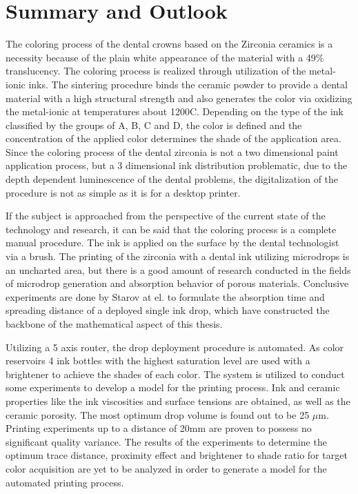 \cleardoublepage
{}


\chapter{Summary and Outlook}
The coloring process of the dental crowns based on the Zirconia ceramics is a necessity because of the plain white appearance of the material with a 49\% translucency. The coloring process is realized through utilization of the metal-ionic inks. The sintering procedure binds the ceramic powder to provide a dental material with a high structural strength and also generates the color via oxidizing the metal-ionic at temperatures about 1200\textdegree C. Depending on the type of the ink classified by the groups of A, B, C and D, the color is defined and the concentration of the applied color determines the shade of the application area. Since the coloring process of the dental zirconia is not a two dimensional paint application process, but a 3 dimensional ink distribution problematic, due to the depth dependent luminescence of the dental problems, the digitalization of the procedure is not as simple as it is for a desktop printer. 

If the subject is approached from the perspective of the current state of the technology and research, it can be said that the coloring process is a complete manual procedure. The ink is applied on the surface by the dental technologist via a brush. The printing of the zirconia with a dental ink utilizing microdrops is an uncharted area, but there is a good amount of research conducted in the fields of microdrop generation and absorption behavior of porous materials. Conclusive experiments are done by Starov at el. to formulate the absorption time and spreading distance of a deployed single ink drop, which have constructed the backbone of the mathematical aspect of this thesis.

Utilizing a 5 axis router, the drop deployment procedure is automated. As color reservoirs 4 ink bottles with the highest saturation level are used with a brightener to achieve the shades of each color. The system is utilized to conduct some experiments to develop a model for the printing process. Ink and ceramic properties like the ink viscosities and surface tensions are obtained, as well as the ceramic porosity. The most optimum drop volume is found out to be 25 $\mu$m. Printing experiments up to a distance of 20mm are proven to possess no significant quality variance. The results of the experiments to determine  the optimum trace distance, proximity effect and brightener to shade ratio for target color acquisition are yet to be analyzed in order to generate a model for the automated printing process. 

